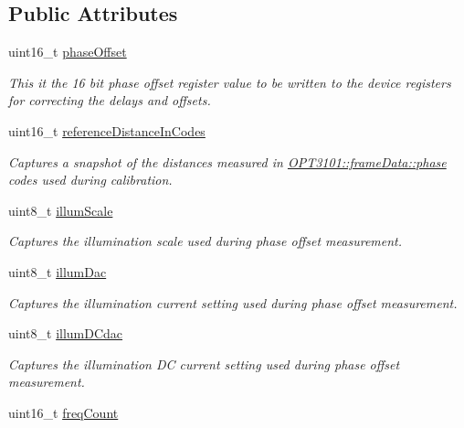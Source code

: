 \subsection*{Public Attributes}
\begin{DoxyCompactItemize}
\item 
uint16\+\_\+t \mbox{\hyperlink{class_o_p_t3101_1_1phase_offset_c_addeef913546f1c431b4fd189478884f9}{phase\+Offset}}
\begin{DoxyCompactList}\small\item\em This it the 16 bit phase offset register value to be written to the device registers for correcting the delays and offsets. \end{DoxyCompactList}\item 
uint16\+\_\+t \mbox{\hyperlink{class_o_p_t3101_1_1phase_offset_c_ac77c406f9d3672254fa2b91e97a22d0c}{reference\+Distance\+In\+Codes}}
\begin{DoxyCompactList}\small\item\em Captures a snapshot of the distances measured in \mbox{\hyperlink{class_o_p_t3101_1_1frame_data_af8661d11405953dc378ad4d7cb0f2db6}{O\+P\+T3101\+::frame\+Data\+::phase}} codes used during calibration. \end{DoxyCompactList}\item 
uint8\+\_\+t \mbox{\hyperlink{class_o_p_t3101_1_1phase_offset_c_a687116f5b495ca2314afd1b4cbc9bf34}{illum\+Scale}}
\begin{DoxyCompactList}\small\item\em Captures the illumination scale used during phase offset measurement. \end{DoxyCompactList}\item 
uint8\+\_\+t \mbox{\hyperlink{class_o_p_t3101_1_1phase_offset_c_a606c3c6697150e9f2672c7f7ad3d08ea}{illum\+Dac}}
\begin{DoxyCompactList}\small\item\em Captures the illumination current setting used during phase offset measurement. \end{DoxyCompactList}\item 
uint8\+\_\+t \mbox{\hyperlink{class_o_p_t3101_1_1phase_offset_c_a99bd3c6d218a562c98d2a842db48aaab}{illum\+D\+Cdac}}
\begin{DoxyCompactList}\small\item\em Captures the illumination DC current setting used during phase offset measurement. \end{DoxyCompactList}\item 
uint16\+\_\+t \mbox{\hyperlink{class_o_p_t3101_1_1phase_offset_c_ab95e4dde3ea8b0ad825d315160fe33ca}{freq\+Count}}

\end{DoxyCompactItemize}
